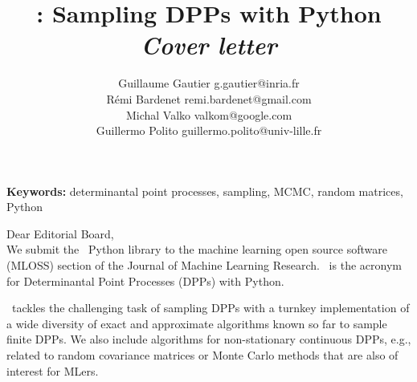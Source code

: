 \documentclass[twoside,11pt]{article}
\begin{document}
\title{\DPPy: Sampling DPPs with Python \\[1pt]
\textit{\normalsize Cover letter}}

\author{\name Guillaume Gautier
            \email g.gautier@inria.fr \\
       \name R\'emi Bardenet
            \email remi.bardenet@gmail.com \\
       \name Michal Valko
            \email valkom@google.com\\
       \name Guillermo Polito
            \email guillermo.polito@univ-lille.fr}

\editor{}

\maketitle




\vspace{-4em}

\textbf{Keywords:}
    determinantal point processes,
    sampling,
    MCMC,
    random matrices,
    Python

\vspace{1em}

\setcounter{footnote}{3}

Dear Editorial Board,\\

We submit the \DPPy\ Python library to the machine learning open source software (MLOSS) section of the Journal of Machine Learning Research.
\DPPy\ is the acronym for Determinantal Point Processes (DPPs) with Python.

\DPPy\ tackles the challenging task of sampling DPPs with a turnkey implementation of a wide diversity of exact and approximate algorithms known so far to sample finite DPPs.
We also include algorithms for non-stationary continuous DPPs, e.g., related to random covariance matrices or Monte Carlo methods that are also of interest for MLers.
\end{document}
